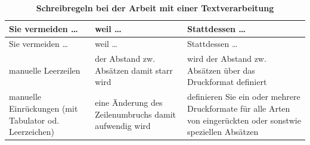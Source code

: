 \documentclass[]{book}
\theoremstyle{definition}
\theoremstyle{definition}
\theoremstyle{definition}
\theoremstyle{remark}
\begin{document}
\begin{longtable}[]{@{}lll@{}}
\caption{\textbf{\label{tab:textverarbeitung} Schreibregeln bei der Arbeit
mit einer Textverarbeitung}}\tabularnewline
\toprule
\begin{minipage}[b]{0.13\columnwidth}\raggedright\strut
Sie vermeiden \ldots{}\strut
\end{minipage} & \begin{minipage}[b]{0.41\columnwidth}\raggedright\strut
weil \ldots{}\strut
\end{minipage} & \begin{minipage}[b]{0.38\columnwidth}\raggedright\strut
Stattdessen \ldots{}\strut
\end{minipage}\tabularnewline
\midrule
\endfirsthead
\toprule
\begin{minipage}[b]{0.13\columnwidth}\raggedright\strut
Sie vermeiden \ldots{}\strut
\end{minipage} & \begin{minipage}[b]{0.41\columnwidth}\raggedright\strut
weil \ldots{}\strut
\end{minipage} & \begin{minipage}[b]{0.38\columnwidth}\raggedright\strut
Stattdessen \ldots{}\strut
\end{minipage}\tabularnewline
\midrule
\endhead
\begin{minipage}[t]{0.13\columnwidth}\raggedright\strut
manuelle Leerzeilen\strut
\end{minipage} & \begin{minipage}[t]{0.41\columnwidth}\raggedright\strut
der Abstand zw. Absätzen damit starr wird\strut
\end{minipage} & \begin{minipage}[t]{0.38\columnwidth}\raggedright\strut
wird der Abstand zw. Absätzen über das Druckformat definiert
\vspace{-6mm}\strut
\end{minipage}\tabularnewline
\begin{minipage}[t]{0.13\columnwidth}\raggedright\strut
manuelle Einrückungen (mit Tabulator od. Leerzeichen)\strut
\end{minipage} & \begin{minipage}[t]{0.41\columnwidth}\raggedright\strut
eine Änderung des Zeilenumbruchs damit aufwendig wird\strut
\end{minipage} & \begin{minipage}[t]{0.38\columnwidth}\raggedright\strut
definieren Sie ein oder mehrere Druckformate für alle Arten von
eingerückten oder sonstwie speziellen Absätzen \vspace{-6mm}\strut

\end{minipage}
\end{longtable}
\end{document}
